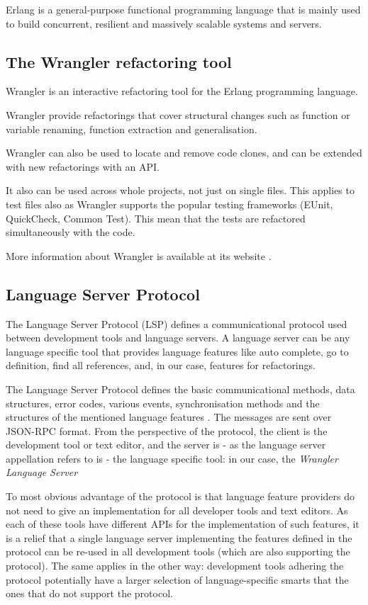 Erlang \cite{Erlang} is a general-purpose functional programming language that is mainly used to build concurrent, resilient and massively scalable systems and servers.


\subsection{The Wrangler refactoring tool}

Wrangler is an interactive refactoring tool for the Erlang programming language.

Wrangler provide refactorings that cover structural changes such as function or variable renaming, function extraction and generalisation.

Wrangler can also be used to locate and remove code clones, and can be extended with new refactorings with an API.

It also can be used across whole projects, not just on single files. This applies to test files also as Wrangler supports the popular testing frameworks (EUnit, QuickCheck, Common Test). This mean that the tests are refactored simultaneously with the code.

More information about Wrangler is available at its website \cite{WranglerHome}.


\subsection{Language Server Protocol}

The Language Server Protocol (LSP) defines a communicational protocol used between development tools and language servers. A language server can be any language specific tool that provides language features like auto complete, go to definition, find all references, and, in our case, features for refactorings.

The Language Server Protocol defines the basic communicational methods, data structures, error codes, various events, synchronisation methods and the structures of the mentioned language features \cite{LSP}. The messages are sent over JSON-RPC format. From the perspective of the protocol, the client is the development tool or text editor, and the server is - as the language server appellation refers to is - the language specific tool: in our case, the \emph{Wrangler Language Server} 

To most obvious advantage of the protocol is that language feature providers do not need to give an implementation for all developer tools and text editors. As each of these tools have different APIs for the implementation of such features, it is a relief that a single language server implementing the features defined in the protocol can be re-used in all development tools (which are also supporting the protocol). The same applies in the other way: development tools adhering the protocol potentially have a larger selection of language-specific smarts that the ones that do not support the protocol.

